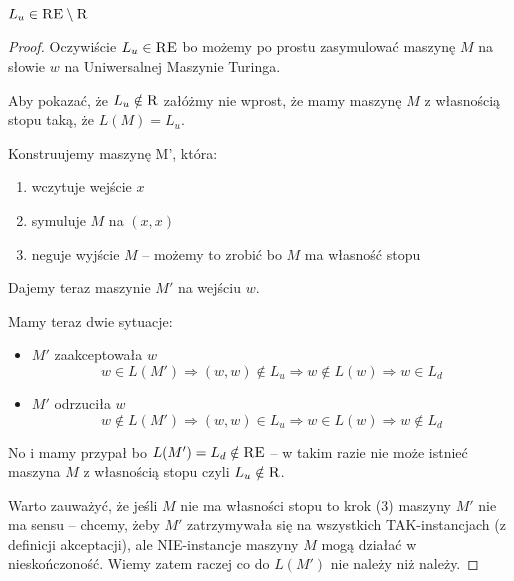 \begin{theorem}
	\( L_u \in \textsc{RE} \setminus \textsc{R} \)
\end{theorem}
\begin{proof}
	Oczywiście \( L_u \in \textsc{RE} \) bo możemy po prostu zasymulować maszynę \( M \) na słowie \( w \) na Uniwersalnej Maszynie Turinga.

	Aby pokazać, że \( L_u \notin \textsc{R} \) załóżmy nie wprost, że mamy maszynę \( M \) z własnością stopu taką, że \( L(M) = L_u \).

	Konstruujemy maszynę M', która:
	\begin{enumerate}
		\item wczytuje wejście \( x \)
		\item symuluje \( M \) na \( (x, x) \)
		\item neguje wyjście \( M \) -- możemy to zrobić bo \( M \) ma własność stopu
	\end{enumerate}

	Dajemy teraz maszynie \( M' \) na wejściu \( w \).

	Mamy teraz dwie sytuacje:
	\begin{itemize}
		\item \( M' \) zaakceptowała \( w \)
		      \[
			      w \in L(M') \Rightarrow (w, w) \notin L_u \Rightarrow w \notin L(w) \Rightarrow w \in L_d
		      \]

		\item \( M' \) odrzuciła \( w \)
		      \[
			      w \notin L(M') \Rightarrow (w, w) \in L_u \Rightarrow w \in L(w)
			      \Rightarrow w \notin L_d
		      \]
	\end{itemize}
	No i mamy przypał bo \( L(M') = L_d \notin \textsc{RE} \) -- w takim razie nie może istnieć maszyna \( M \) z własnością stopu czyli \( L_u \notin \textsc{R} \).

	Warto zauważyć, że jeśli \( M \) nie ma własności stopu to krok (3) maszyny \( M' \) nie ma sensu -- chcemy, żeby \( M' \) zatrzymywała się na wszystkich TAK-instancjach (z definicji akceptacji), ale NIE-instancje maszyny \( M \) mogą działać w nieskończoność. Wiemy zatem raczej co do \( L(M') \) nie należy niż należy.

\end{proof}